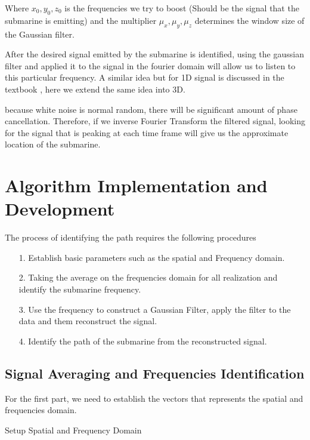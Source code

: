 \documentclass{article}
\begin{document}
    \par
    Where $x_0, y_0, z_0$ is the frequencies we try to boost (Should be the signal that the submarine is emitting) and the multiplier $\mu_x, \mu_y, \mu_z$ determines the window size of the Gaussian filter. 
    
    \par
    After the desired signal emitted by the submarine is identified, using the gaussian filter and applied it to the signal in the fourier domain will allow us to listen to this particular frequency. A similar idea but for 1D signal is discussed in the textbook\cite{kutz_2013_pg312} , here we extend the same idea into 3D. 

    \par
    because white noise is normal random, there will be significant amount of phase cancellation. Therefore, if we inverse Fourier Transform the filtered signal, looking for the signal that is peaking at each time frame will give us the approximate location of the submarine. 

\section{Algorithm Implementation and Development}
The process of identifying the path requires the following procedures
\begin{enumerate}
    \item[1.] Establish basic parameters such as the spatial and Frequency domain.
    \item[2.] Taking the average on the frequencies domain for all realization and identify the submarine frequency.
    \item[3.] Use the frequency to construct a Gaussian Filter, apply the filter to the data and them reconstruct the signal.
    \item[4.] Identify the path of the submarine from the reconstructed signal. 
\end{enumerate}

\newpage
\subsection{Signal Averaging and Frequencies Identification}
    For the first part, we need to establish the vectors that represents the spatial and frequencies domain.
    \begin{algorithm}\label{alg:setup}\small
        \begin{algorithmic}[1]
        \end{algorithmic}\caption{Setup Spatial and Frequency Domain}
    \end{algorithm}
\end{document}
